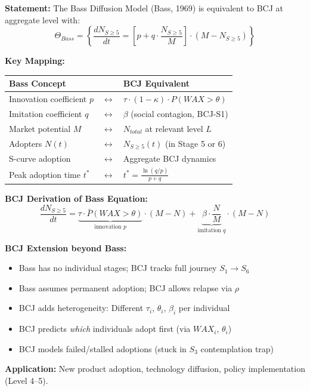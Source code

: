 \begin{tcolorbox}[colback=green!5!white, colframe=green!75!black,
    title=Theorem BCJ-T18: Bass Diffusion Model as Special Case]
\textbf{Statement:} The Bass Diffusion Model (Bass, 1969) is equivalent to BCJ at aggregate level with:
\begin{equation}
\Theta_{Bass} = \left\{\frac{dN_{S \geq 5}}{dt} = \left[p + q \cdot \frac{N_{S \geq 5}}{M}\right] \cdot (M - N_{S \geq 5})\right\}
\end{equation}

\textbf{Key Mapping:}
\begin{center}
\begin{tabular}{lcl}
\toprule
\textbf{Bass Concept} & & \textbf{BCJ Equivalent} \\
\midrule
Innovation coefficient $p$ & $\leftrightarrow$ & $\tau \cdot (1 - \kappa) \cdot P(WAX > \theta)$ \\
Imitation coefficient $q$ & $\leftrightarrow$ & $\beta$ (social contagion, BCJ-S1) \\
Market potential $M$ & $\leftrightarrow$ & $N_{total}$ at relevant level $L$ \\
Adopters $N(t)$ & $\leftrightarrow$ & $N_{S \geq 5}(t)$ (in Stage 5 or 6) \\
S-curve adoption & $\leftrightarrow$ & Aggregate BCJ dynamics \\
Peak adoption time $t^*$ & $\leftrightarrow$ & $t^* = \frac{\ln(q/p)}{p + q}$ \\
\bottomrule
\end{tabular}
\end{center}

\textbf{BCJ Derivation of Bass Equation:}
\begin{equation}
\frac{dN_{S \geq 5}}{dt} = \underbrace{\tau \cdot \bar{P}(WAX > \theta)}_{\text{innovation } p} \cdot (M - N) + \underbrace{\beta \cdot \frac{N}{M}}_{\text{imitation } q} \cdot (M - N)
\end{equation}

\textbf{BCJ Extension beyond Bass:}
\begin{itemize}[nosep]
\item Bass has no individual stages; BCJ tracks full journey $S_1 \to S_6$
\item Bass assumes permanent adoption; BCJ allows relapse via $\rho$
\item BCJ adds heterogeneity: Different $\tau_i$, $\theta_i$, $\beta_i$ per individual
\item BCJ predicts \textit{which} individuals adopt first (via $WAX_i$, $\theta_i$)
\item BCJ models failed/stalled adoptions (stuck in $S_3$ contemplation trap)
\end{itemize}

\textbf{Application:} New product adoption, technology diffusion, policy implementation (Level 4--5).
\end{tcolorbox}

